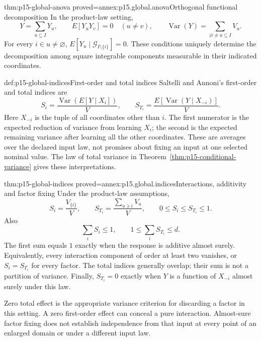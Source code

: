 \begin{hbtheorem}{thm:p15-global-anova}
 {proved=annex:p15.global.anova}{Orthogonal functional decomposition}
In the product-law setting,
\[
 Y=\sum_{u\subseteq I}Y_u,\qquad
 E[Y_uY_v]=0\quad(u\ne v),\qquad
 \operatorname{Var}(Y)=\sum_{\varnothing\ne u\subseteq I}V_u.
\]
For every \(i\in u\ne\varnothing\),
\(E[Y_u\mid\mathcal G_{I\setminus\{i\}}]=0\).
These conditions uniquely determine the decomposition among square
integrable components measurable in their indicated coordinates.
\end{hbtheorem}

\begin{hbdefinition}{def:p15-global-indices}{First-order and total indices}
Saltelli and Annoni's first-order and total indices are
\[
 S_i=\frac{\operatorname{Var}(E[Y\mid X_i])}{V},\qquad
 S_{T_i}=\frac{E[\operatorname{Var}(Y\mid X_{-i})]}{V}.
\]
Here \(X_{-i}\) is the tuple of all coordinates other than \(i\).
The first numerator is the expected reduction of variance from learning
\(X_i\); the second is the expected remaining variance after learning all
the other coordinates. These are averages over the declared input law,
not promises about fixing an input at one selected nominal value.
The law of total variance in
Theorem~\ref{thm:p15-conditional-variance} gives these interpretations.
\end{hbdefinition}

\begin{hbtheorem}{thm:p15-global-indices}
 {proved=annex:p15.global.indices}{Interactions, additivity and factor fixing}
Under the product-law assumptions,
\[
 S_i=\frac{V_{\{i\}}}{V},\qquad
 S_{T_i}=\frac{\sum_{u\ni i}V_u}{V},\qquad
 0\leq S_i\leq S_{T_i}\leq1.
\]
Also
\[
 \sum_i S_i\leq1,\qquad
 1\leq\sum_iS_{T_i}\leq d.
\]
The first sum equals \(1\) exactly when the response is additive almost
surely. Equivalently, every interaction component of order at least two
vanishes, or \(S_i=S_{T_i}\) for every factor.
The total indices generally overlap; their sum is not a partition of
variance. Finally, \(S_{T_i}=0\) exactly when \(Y\) is a function of
\(X_{-i}\) almost surely under this law.
\end{hbtheorem}

Zero total effect is the appropriate variance criterion for discarding a
factor in this setting. A zero first-order effect can conceal a pure
interaction. Almost-sure factor fixing does not establish independence
from that input at every point of an enlarged domain or under a different
input law.

